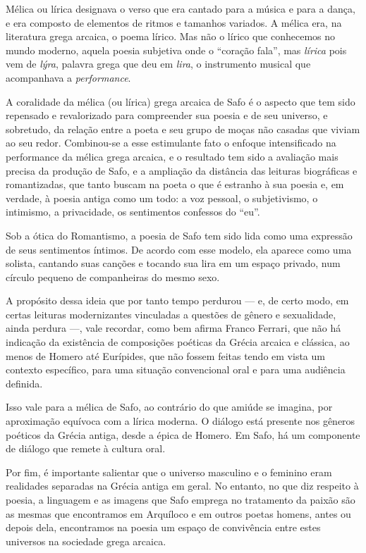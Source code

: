 \documentclass[12pt]{extarticle}
\begin{document}
Mélica ou lírica designava o verso que era cantado para a música e para a 
dança, e era composto de elementos de ritmos e tamanhos variados. A mélica era, 
na literatura grega arcaica, o poema lírico. Mas não o lírico que conhecemos no
mundo moderno, aquela poesia subjetiva onde o ``coração fala'', mas \emph{lírica}
pois vem de \textit{lýra}, palavra grega que deu em \emph{lira}, o instrumento musical
que acompanhava a \textit{performance}.

A coralidade da mélica (ou lírica) grega arcaica de Safo é o aspecto que tem sido 
repensado e revalorizado para compreender sua poesia e de seu universo, e sobretudo, 
da relação entre a poeta e seu grupo de moças não casadas que viviam ao seu redor.
Combinou-se a esse estimulante fato o enfoque intensificado na performance da mélica 
grega arcaica, e o resultado tem sido a avaliação mais precisa da produção de Safo, 
e a ampliação da distância das leituras biográficas e romantizadas, que tanto 
buscam na poeta o que é estranho à sua poesia e, em verdade, à poesia antiga como 
um todo: a voz pessoal, o subjetivismo, o intimismo, a privacidade, os sentimentos 
confessos do ``eu''. 

Sob a ótica do Romantismo, a poesia de Safo tem sido lida como uma expressão de 
seus sentimentos íntimos. De acordo com esse modelo, ela aparece como uma solista, 
cantando suas canções e tocando sua lira em um espaço privado, num círculo 
pequeno de companheiras do mesmo sexo.

A propósito dessa ideia que por tanto tempo perdurou --- e, de certo modo, em
certas leituras modernizantes vinculadas a questões de gênero e sexualidade, 
ainda perdura ---, vale recordar, como bem afirma Franco Ferrari, que não há 
indicação da existência de composições poéticas da Grécia arcaica e clássica, 
ao menos de Homero até Eurípides, que não fossem feitas tendo em vista um 
contexto específico, para uma situação convencional oral e para uma audiência definida. 

Isso vale para a mélica de Safo, ao contrário do que amiúde se imagina, por 
aproximação equívoca com a lírica moderna. O diálogo está presente nos gêneros 
poéticos da Grécia antiga, desde a épica de Homero. Em Safo, há um componente 
de diálogo que remete à cultura oral.
 
Por fim, é importante salientar que o universo masculino e o feminino eram 
realidades separadas na Grécia antiga em geral. No entanto, no que diz respeito
à poesia, a linguagem e as imagens que Safo emprega no tratamento da paixão 
são as mesmas que encontramos em Arquíloco e em outros poetas homens, antes 
ou depois dela, encontramos na poesia um espaço de convivência entre estes
universos na sociedade grega arcaica.
\end{document}
